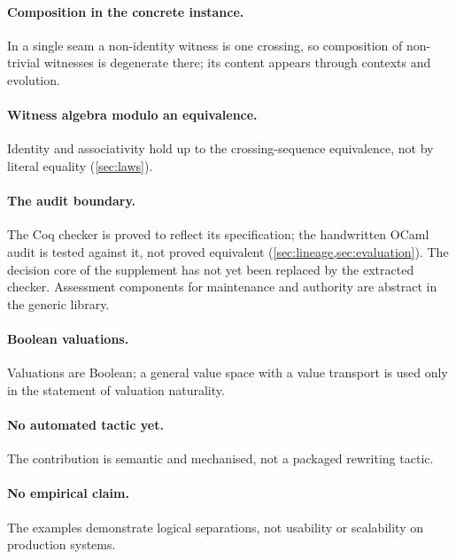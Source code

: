 \paragraph{Composition in the concrete instance.}
In a single seam a non-identity witness is one crossing, so composition of non-trivial witnesses is degenerate there; its content appears through contexts and evolution.

\paragraph{Witness algebra modulo an equivalence.}
Identity and associativity hold up to the crossing-sequence equivalence, not by literal equality (\cref{sec:laws}).

\paragraph{The audit boundary.}
The Coq checker is proved to reflect its specification; the handwritten OCaml audit is tested against it, not proved equivalent (\cref{sec:lineage,sec:evaluation}). The decision core of the supplement has not yet been replaced by the extracted checker. Assessment components for maintenance and authority are abstract in the generic library.

\paragraph{Boolean valuations.}
Valuations are Boolean; a general value space with a value transport is used only in the statement of valuation naturality.

\paragraph{No automated tactic yet.}
The contribution is semantic and mechanised, not a packaged rewriting tactic.

\paragraph{No empirical claim.}
The examples demonstrate logical separations, not usability or scalability on production systems.
